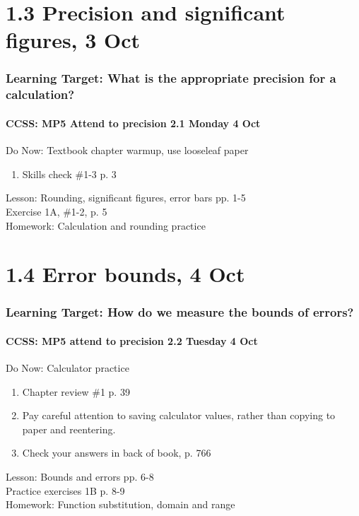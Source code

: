 \documentclass{beamer}
\begin{document}
  \section{1.3 Precision and significant figures, 3 Oct}
  \frame
  {
    \frametitle{Learning Target: What is the appropriate precision for a calculation?}
    \framesubtitle{CCSS: MP5 Attend to precision \hfill \alert{2.1 Monday 4 Oct}}

    \begin{block}{Do Now: Textbook chapter warmup, use looseleaf paper}
    \begin{enumerate}
        \item Skills check \#1-3 p. 3
    \end{enumerate}
    \end{block}
    Lesson: Rounding, significant figures, error bars pp. 1-5\\
    Exercise 1A, \#1-2, p. 5
    \\[0.5cm]
    Homework: Calculation and rounding practice
  }

  \section{1.4 Error bounds, 4 Oct}
  \frame
  {
    \frametitle{Learning Target: How do we measure the bounds of errors?}
    \framesubtitle{CCSS: MP5 attend to precision \hfill \alert{2.2 Tuesday 4 Oct}}

    \begin{block}{Do Now: Calculator practice}
    \begin{enumerate}
        \item Chapter review \#1 p. 39
        \item Pay careful attention to saving calculator values, rather than copying to paper and reentering.
        \item Check your answers in back of book, p. 766
    \end{enumerate}
    \end{block}
    Lesson: Bounds and errors pp. 6-8\\ \bigskip
    Practice exercises 1B p. 8-9\\
    Homework: Function substitution, domain and range
  }
\end{document}
